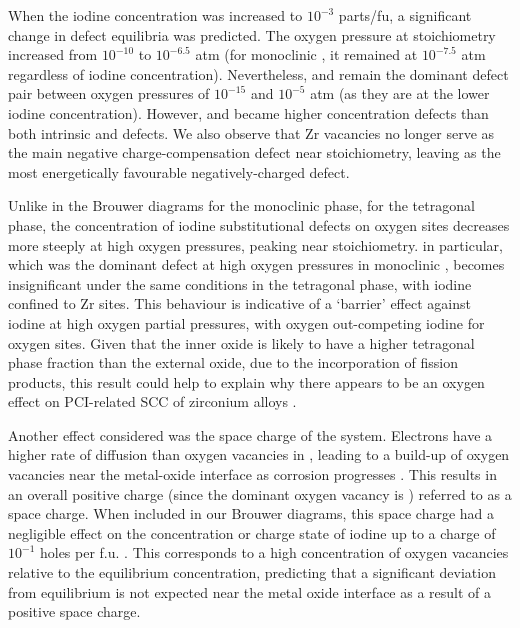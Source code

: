 When the iodine concentration was increased to $10^{-3}$ parts/fu, a significant change in defect equilibria was predicted. The oxygen pressure at stoichiometry increased from $10^{-10}$ to $10^{-6.5}$ atm (for monoclinic \zirconia, it remained at $10^{-7.5}$ atm regardless of iodine concentration). Nevertheless,  and  remain the dominant defect pair between oxygen pressures of $10^{-15}$ and $10^{-5}$ atm (as they are at the lower iodine concentration). However,  and  became higher concentration defects than both intrinsic  and  defects. We also observe that Zr vacancies no longer serve as the main negative charge-compensation defect near stoichiometry, leaving  as the most energetically favourable negatively-charged defect.  

Unlike in the Brouwer diagrams for the monoclinic phase, for the tetragonal phase, the concentration of iodine substitutional defects on oxygen sites decreases more steeply at high oxygen pressures, peaking near stoichiometry.  in particular, which was the dominant defect at high oxygen pressures in monoclinic \zirconia , becomes insignificant under the same conditions in the tetragonal phase, with iodine confined to Zr sites. This behaviour is indicative of a `barrier' effect against iodine at high oxygen partial pressures, with oxygen out-competing iodine for oxygen sites. Given that the inner oxide is likely to have a higher tetragonal phase fraction than the external oxide, due to the incorporation of fission products, this result could help to explain why there appears to be an oxygen effect on PCI-related SCC of zirconium alloys \cite{hofmann1984stress}. 

Another effect considered was the space charge of the system. Electrons have a higher rate of diffusion than oxygen vacancies in \zirconia , leading to a build-up of oxygen vacancies near the metal-oxide interface as corrosion progresses \cite{bojinov2010influence}. This results in an overall positive charge (since the dominant oxygen vacancy is ) referred to as a space charge. When included in our Brouwer diagrams, this space charge had a negligible effect on the concentration or charge state of iodine up to a charge of $10^{-1}$ holes per f.u. \zirconia . This corresponds to a high concentration of oxygen vacancies relative to the equilibrium concentration, predicting that a significant deviation from equilibrium is not expected near the metal oxide interface as a result of a positive space charge.



